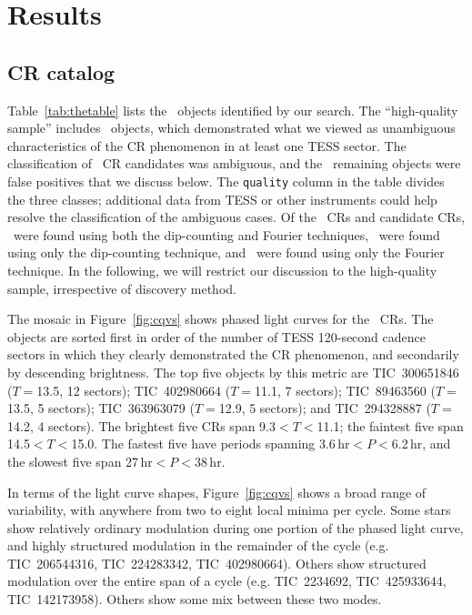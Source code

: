 \documentclass[11pt,twocolumn,tighten]{aastex63}
\begin{document}
\section{Results}
\label{sec:results}

\subsection{CR catalog}
\label{sec:catalog}

Table~\ref{tab:thetable} lists the \nallcands\ objects identified by
our search.  The ``high-quality sample'' includes \ngoods\ objects,
which demonstrated what we viewed as unambiguous characteristics of
the CR phenomenon in at least one TESS sector.  The classification of
\nmaybes\ CR candidates was ambiguous, and the \ndebunked\ remaining
objects were false positives that we discuss below.  The
\texttt{quality} column in the table divides the three classes;
additional data from TESS or other instruments could help resolve the
classification of the ambiguous cases.   Of the \ncqvsnodebunked\ CRs
and candidate CRs, \nbothdipfourier\ were found using both the
dip-counting and Fourier techniques, \nyesdipnofourier\ were found
using only the dip-counting technique, and \nyesfouriernodip\ were
found using only the Fourier technique.  In the following, we will
restrict our discussion to the high-quality sample, irrespective of
discovery method.

The mosaic in Figure~\ref{fig:cqvs} shows phased light curves for the
\ngoods\ CRs.  The objects are sorted first in order of the number of
TESS 120-second cadence sectors in which they clearly demonstrated the
CR phenomenon, and secondarily by descending brightness.  The top
five objects by this metric are TIC~300651846 ($T$$=$13.5, 12
sectors); TIC~402980664 ($T$$=$11.1, 7 sectors); TIC~89463560
($T$$=$13.5, 5 sectors); TIC~363963079 ($T$$=$12.9, 5 sectors); and
TIC~294328887 ($T$$=$14.2, 4 sectors).  The brightest five CRs span
9.3$<$$T$$<$11.1; the faintest five span 14.5$<$$T$$<$15.0.  The
fastest five have periods spanning 3.6\,hr$<$$P$$<$6.2\,hr, and the
slowest five span 27\,hr$<$$P$$<$38\,hr.

In terms of the light curve shapes, Figure~\ref{fig:cqvs} shows a
broad range of variability, with anywhere from two to eight local
minima per cycle.  Some stars show relatively ordinary modulation
during one portion of the phased light curve, and highly structured
modulation in the remainder of the cycle (e.g.  TIC~206544316,
TIC~224283342, TIC~402980664).  Others show structured modulation over
the entire span of a cycle (e.g. TIC~2234692, TIC~425933644,
TIC~142173958).  Others show some mix between these two modes.
\end{document}
